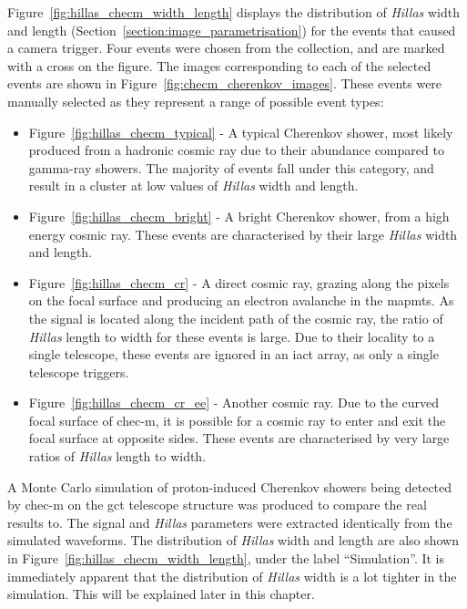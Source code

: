Figure~\ref{fig:hillas_checm_width_length} displays the distribution of \textit{Hillas} width and length (Section~\ref{section:image_parametrisation}) for the events that caused a camera trigger. Four events were chosen from the collection, and are marked with a cross on the figure. The images corresponding to each of the selected events are shown in Figure~\ref{fig:checm_cherenkov_images}. These events were manually selected as they represent a range of possible event types:
\begin{itemize}
\item Figure~\ref{fig:hillas_checm_typical} - A typical Cherenkov shower, most likely produced from a hadronic cosmic ray due to their abundance compared to gamma-ray showers. The majority of events fall under this category, and result in a cluster at low values of \textit{Hillas} width and length.
\item Figure~\ref{fig:hillas_checm_bright} - A bright Cherenkov shower, from a high energy cosmic ray. These events are characterised by their large \textit{Hillas} width and length. 
\item Figure~\ref{fig:hillas_checm_cr} - A direct cosmic ray, grazing along the pixels on the focal surface and producing an electron avalanche in the \glspl{mapmt}. As the signal is located along the incident path of the cosmic ray, the ratio of \textit{Hillas} length to width for these events is large. Due to their locality to a single telescope, these events are ignored in an \gls{iact} array, as only a single telescope triggers.
\item Figure~\ref{fig:hillas_checm_cr_ee} - Another cosmic ray. Due to the curved focal surface of \gls{chec-m}, it is possible for a cosmic ray to enter and exit the focal surface at opposite sides. These events are characterised by very large ratios of \textit{Hillas} length to width.
\end{itemize}

A Monte Carlo simulation of proton-induced Cherenkov showers being detected by \gls{chec-m} on the \gls{gct} telescope structure was produced to compare the real results to. The signal and \textit{Hillas} parameters were extracted identically from the simulated waveforms. The distribution of \textit{Hillas} width and length are also shown in Figure~\ref{fig:hillas_checm_width_length}, under the label ``Simulation''. It is immediately apparent that the distribution of \textit{Hillas} width is a lot tighter in the simulation. This will be explained later in this chapter.

